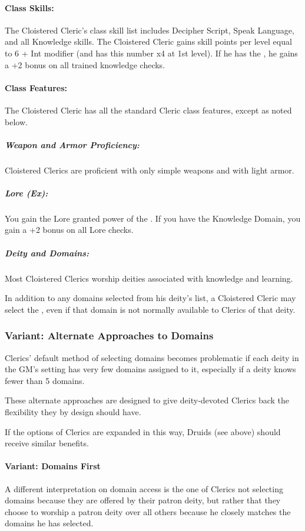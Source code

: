 \paragraph{Class Skills:}
The Cloistered Cleric's class skill list includes Decipher Script, Speak Language, and all Knowledge skills. The Cloistered Cleric gains skill points per level equal to 6 + Int modifier (and has this number x4 at 1st level). If he has the , he gains a +2 bonus on all trained knowledge checks.

\paragraph{Class Features:}
The Cloistered Cleric has all the standard Cleric class features, except as noted below.

\subparagraph{Weapon and Armor Proficiency:}
Cloistered Clerics are proficient with only simple weapons and with light armor.

\subparagraph{Lore (Ex):}
You gain the Lore granted power of the .
If you have the Knowledge Domain, you gain a +2 bonus on all Lore checks.

\subparagraph{Deity and Domains:}
Most Cloistered Clerics worship deities associated with knowledge and learning.

In addition to any domains selected from his deity's list, a Cloistered Cleric may select the , even if that  domain is not normally available to Clerics of that deity.
\subsubsection{Variant: Alternate Approaches to Domains}
Clerics' default method of selecting domains becomes problematic if each deity in the GM's setting has very few domains assigned to it, especially if a deity knows fewer than 5 domains.

These alternate approaches are designed to give deity-devoted Clerics back the flexibility they by design should have.

If the options of Clerics are expanded in this way, Druids (see above) should receive similar benefits.
\paragraph{Variant: Domains First}
A different interpretation on domain access is the one of 
Clerics not selecting domains because they are offered by their patron deity, but rather that they choose to worship a patron deity over all others because he closely matches the domains he has selected.

